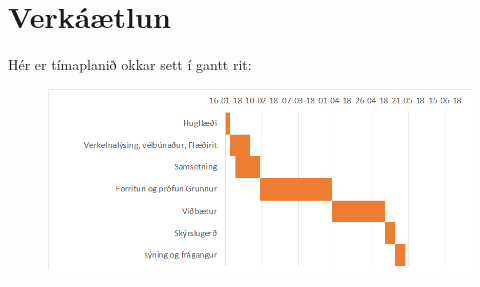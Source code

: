 \section{Verkáætlun}
Hér er tímaplanið okkar sett í gantt rit:
\begin{figure}[h]
\includegraphics[scale=.7]{img/timaaetlun}
\end{figure}